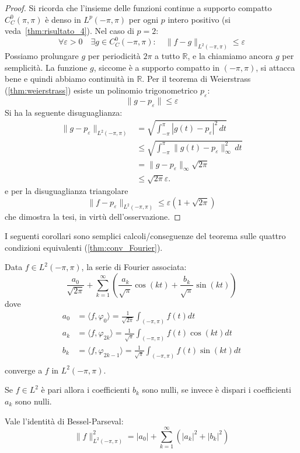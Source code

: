 \begin{proof}
    Si ricorda che l'insieme delle funzioni continue a supporto compatto
    \(C_C^0(\pi, \pi)\) è denso in \(L^p(-\pi, \pi)\) per ogni \(p\) intero
    positivo (si veda~\ref{thm:risultato_4}). Nel caso di \(p=2\):
    \[
        \forall \varepsilon >0 \quad \exists g \in C_C^0 (-\pi, \pi): \quad \| f-g\|_{L^2(-\pi, \pi) } \leq \varepsilon
    \]
    Possiamo prolungare \(g\) per periodicità \(2 \pi\) a tutto \(\mathbb R\), e
    la chiamiamo ancora \(g\) per semplicità. La funzione \(g\), siccome è a
    supporto compatto in \((-\pi, \pi)\), si attacca bene e quindi abbiamo
    continuità in \(\mathbb R\). Per il teorema di Weierstrass
    (\ref{thm:weierstrass}) esiste un polinomio trigonometrico
    \(p_\varepsilon\): 
    \[
    \| g - p_\varepsilon\| \leq \varepsilon
    \]
    Si ha la seguente disuguaglianza: 
   \[
    \begin{aligned}
        \|g - p_\varepsilon\|_{L^2(-\pi, \pi)} 
        &= \sqrt{\int_{-\pi}^\pi |g(t) - p_\varepsilon|^2 \, dt} \\
        &\leq \sqrt{\int_{-\pi}^\pi \|g(t) - p_\varepsilon\|_\infty^2 \, dt} \\
        &= \|g - p_\varepsilon\|_\infty \sqrt{2\pi} \\
        &\leq \sqrt{2\pi} \varepsilon.
    \end{aligned}
    \]
    e per la disuguaglianza triangolare
    \[
    \|f-p_\varepsilon\|_{L^2(-\pi, \pi)} \leq \varepsilon(1+\sqrt{2\pi})
    \]
    che dimostra la tesi, in virtù dell'osservazione. 
\end{proof}
I seguenti corollari sono semplici calcoli/conseguenze del teorema sulle quattro
condizioni equivalenti (\ref{thm:conv_Fourier}). 
\begin{corollary}
    Data \(f \in L^2(-\pi, \pi)\), la serie di Fourier associata: 
    \[
    \frac{a_0}{\sqrt{2\pi}} + \sum_{k=1}^{\infty} \left( \frac{a_k}{\sqrt{\pi}} \cos(kt) + \frac{b_k}{\sqrt{\pi}} \sin(kt)\right)
    \]
    dove
    \[
    \begin{aligned}
        a_0 &= \langle f, \varphi_0 \rangle   = \frac{1}{\sqrt{2\pi}} \int_{(-\pi, \pi)} f(t) dt \\
        a_k &= \langle f, \varphi_{2k}\rangle = \frac{1}{\sqrt{\pi}} \int_{(-\pi, \pi)} f(t) \cos(kt) dt \\
        b_k &= \langle f, \varphi_{2k-1}\rangle = \frac{1}{\sqrt{\pi}} \int_{(-\pi, \pi)} f(t) \sin(kt) dt \\
    \end{aligned}
    \]
    converge a \(f\) in \(L^2(-\pi, \pi)\).
\end{corollary}
\begin{corollary}
    Se \(f \in L^2\) è pari allora i coefficienti \(b_k\) sono nulli, se invece è dispari i coefficienti 
    \(a_k\) sono nulli.
\end{corollary}
\begin{corollary}
    Vale l'identità di Bessel-Parseval: 
    \[\|f\|_{L^2(-\pi, \pi)}^2 = |a_0| + \sum_{k=1}^\infty (|a_k|^2+|b_k|^2)\]
\end{corollary}


